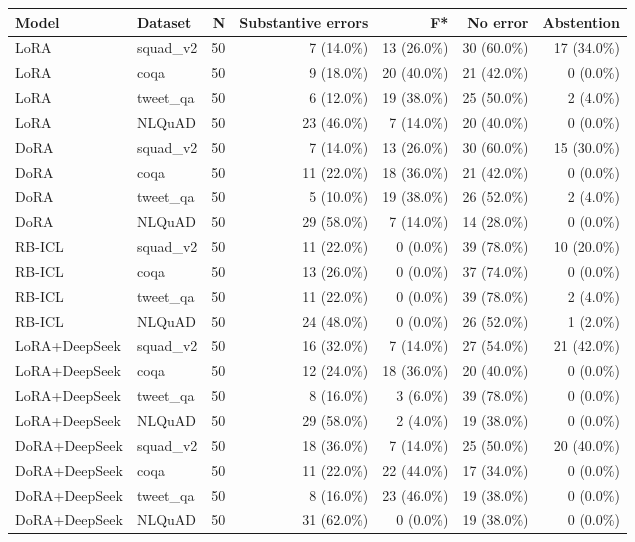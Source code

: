 \begin{table}[htbp]
\centering
\small
\begin{tabular}{llrrrrr}
\toprule
Model & Dataset & N & Substantive errors & F* & No error & Abstention \\
\midrule
LoRA & squad\_v2 & 50 & 7 (14.0\%) & 13 (26.0\%) & 30 (60.0\%) & 17 (34.0\%) \\
LoRA & coqa & 50 & 9 (18.0\%) & 20 (40.0\%) & 21 (42.0\%) & 0 (0.0\%) \\
LoRA & tweet\_qa & 50 & 6 (12.0\%) & 19 (38.0\%) & 25 (50.0\%) & 2 (4.0\%) \\
LoRA & NLQuAD & 50 & 23 (46.0\%) & 7 (14.0\%) & 20 (40.0\%) & 0 (0.0\%) \\
DoRA & squad\_v2 & 50 & 7 (14.0\%) & 13 (26.0\%) & 30 (60.0\%) & 15 (30.0\%) \\
DoRA & coqa & 50 & 11 (22.0\%) & 18 (36.0\%) & 21 (42.0\%) & 0 (0.0\%) \\
DoRA & tweet\_qa & 50 & 5 (10.0\%) & 19 (38.0\%) & 26 (52.0\%) & 2 (4.0\%) \\
DoRA & NLQuAD & 50 & 29 (58.0\%) & 7 (14.0\%) & 14 (28.0\%) & 0 (0.0\%) \\
RB-ICL & squad\_v2 & 50 & 11 (22.0\%) & 0 (0.0\%) & 39 (78.0\%) & 10 (20.0\%) \\
RB-ICL & coqa & 50 & 13 (26.0\%) & 0 (0.0\%) & 37 (74.0\%) & 0 (0.0\%) \\
RB-ICL & tweet\_qa & 50 & 11 (22.0\%) & 0 (0.0\%) & 39 (78.0\%) & 2 (4.0\%) \\
RB-ICL & NLQuAD & 50 & 24 (48.0\%) & 0 (0.0\%) & 26 (52.0\%) & 1 (2.0\%) \\
LoRA+DeepSeek & squad\_v2 & 50 & 16 (32.0\%) & 7 (14.0\%) & 27 (54.0\%) & 21 (42.0\%) \\
LoRA+DeepSeek & coqa & 50 & 12 (24.0\%) & 18 (36.0\%) & 20 (40.0\%) & 0 (0.0\%) \\
LoRA+DeepSeek & tweet\_qa & 50 & 8 (16.0\%) & 3 (6.0\%) & 39 (78.0\%) & 0 (0.0\%) \\
LoRA+DeepSeek & NLQuAD & 50 & 29 (58.0\%) & 2 (4.0\%) & 19 (38.0\%) & 0 (0.0\%) \\
DoRA+DeepSeek & squad\_v2 & 50 & 18 (36.0\%) & 7 (14.0\%) & 25 (50.0\%) & 20 (40.0\%) \\
DoRA+DeepSeek & coqa & 50 & 11 (22.0\%) & 22 (44.0\%) & 17 (34.0\%) & 0 (0.0\%) \\
DoRA+DeepSeek & tweet\_qa & 50 & 8 (16.0\%) & 23 (46.0\%) & 19 (38.0\%) & 0 (0.0\%) \\
DoRA+DeepSeek & NLQuAD & 50 & 31 (62.0\%) & 0 (0.0\%) & 19 (38.0\%) & 0 (0.0\%) \\

\end{tabular}
\end{table}
